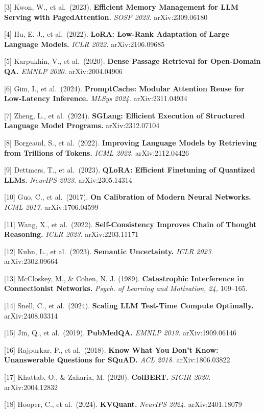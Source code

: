 {[}3{]} Kwon, W., et al.~(2023). \textbf{Efficient Memory Management for LLM Serving with PagedAttention.} \emph{SOSP 2023.} arXiv:2309.06180

{[}4{]} Hu, E. J., et al.~(2022). \textbf{LoRA: Low-Rank Adaptation of Large Language Models.} \emph{ICLR 2022.} arXiv:2106.09685

{[}5{]} Karpukhin, V., et al.~(2020). \textbf{Dense Passage Retrieval for Open-Domain QA.} \emph{EMNLP 2020.} arXiv:2004.04906

{[}6{]} Gim, I., et al.~(2024). \textbf{PromptCache: Modular Attention Reuse for Low-Latency Inference.} \emph{MLSys 2024.} arXiv:2311.04934

{[}7{]} Zheng, L., et al.~(2024). \textbf{SGLang: Efficient Execution of Structured Language Model Programs.} arXiv:2312.07104

{[}8{]} Borgeaud, S., et al.~(2022). \textbf{Improving Language Models by Retrieving from Trillions of Tokens.} \emph{ICML 2022.} arXiv:2112.04426

{[}9{]} Dettmers, T., et al.~(2023). \textbf{QLoRA: Efficient Finetuning of Quantized LLMs.} \emph{NeurIPS 2023.} arXiv:2305.14314

{[}10{]} Guo, C., et al.~(2017). \textbf{On Calibration of Modern Neural Networks.} \emph{ICML 2017.} arXiv:1706.04599

{[}11{]} Wang, X., et al.~(2022). \textbf{Self-Consistency Improves Chain of Thought Reasoning.} \emph{ICLR 2023.} arXiv:2203.11171

{[}12{]} Kuhn, L., et al.~(2023). \textbf{Semantic Uncertainty.} \emph{ICLR 2023.} arXiv:2302.09664

{[}13{]} McCloskey, M., \& Cohen, N. J. (1989). \textbf{Catastrophic Interference in Connectionist Networks.} \emph{Psych. of Learning and Motivation, 24,} 109--165.

{[}14{]} Snell, C., et al.~(2024). \textbf{Scaling LLM Test-Time Compute Optimally.} arXiv:2408.03314

{[}15{]} Jin, Q., et al.~(2019). \textbf{PubMedQA.} \emph{EMNLP 2019.} arXiv:1909.06146

{[}16{]} Rajpurkar, P., et al.~(2018). \textbf{Know What You Don't Know: Unanswerable Questions for SQuAD.} \emph{ACL 2018.} arXiv:1806.03822

{[}17{]} Khattab, O., \& Zaharia, M. (2020). \textbf{ColBERT.} \emph{SIGIR 2020.} arXiv:2004.12832

{[}18{]} Hooper, C., et al.~(2024). \textbf{KVQuant.} \emph{NeurIPS 2024.} arXiv:2401.18079

